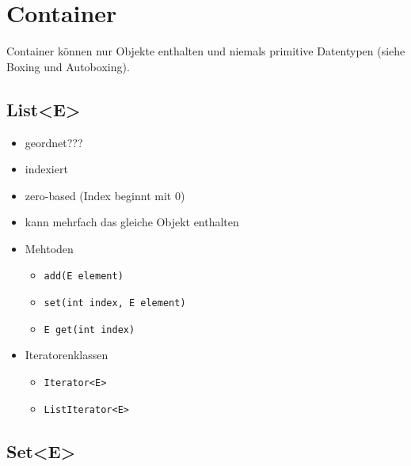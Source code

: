 



\newpage
\section{Container}
Container können nur Objekte enthalten und niemals primitive
Datentypen (siehe Boxing und Autoboxing).

\subsection{List<E>}

\begin{itemize}
	\item geordnet???
	\item indexiert
	\item zero-based (Index beginnt mit 0)
	\item kann mehrfach das gleiche Objekt enthalten
	\item Mehtoden
		\begin{itemize}
			\item \lstinline{add(E element)}
			\item \lstinline{set(int index, E element)}
			\item \lstinline{E get(int index)}
		\end{itemize}
	\item Iteratorenklassen
		\begin{itemize}
			\item \lstinline{Iterator<E>}
			\item \lstinline{ListIterator<E>}
		\end{itemize}
\end{itemize}

\subsection{Set<E>}

